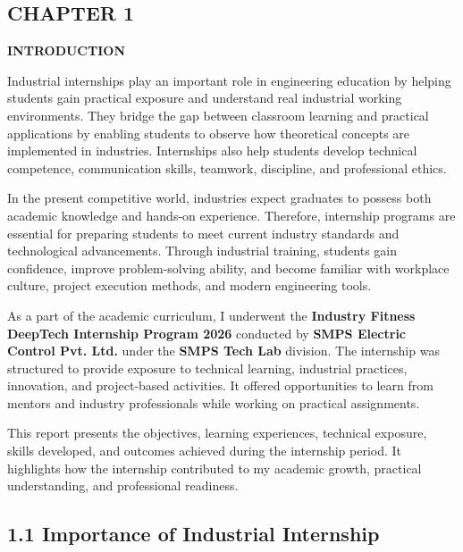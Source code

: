 \documentclass[10pt]{article}
\begin{document}
\doublespacing


\newpage
{}
\begin{flushleft}
{\fontsize{16pt}{16pt}\selectfont
\section*{CHAPTER 1}}
\end{flushleft}
\begin{center}
{\fontsize{18pt}{18pt}\selectfont \textbf{INTRODUCTION}}
\end{center}
\onehalfspacing
\fontsize{12pt}{14pt}\selectfont
\setlength{\parskip}{6pt}

\noindent
Industrial internships play an important role in engineering education by helping students gain practical    exposure and understand real industrial working environments. They bridge the gap between classroom learning and practical applications by enabling students to observe how theoretical concepts are implemented in industries. Internships also help students develop technical competence, communication skills, teamwork, discipline, and professional ethics.

\noindent
In the present competitive world, industries expect graduates to possess both academic knowledge and hands-on experience. Therefore, internship programs are essential for preparing students to meet current industry standards and technological advancements. Through industrial training, students gain confidence, improve problem-solving ability, and become familiar with workplace culture, project execution methods, and modern engineering tools.

\noindent
As a part of the academic curriculum, I underwent the \textbf{Industry Fitness DeepTech Internship Program 2026} conducted by \textbf{SMPS Electric Control Pvt. Ltd.} under the \textbf{SMPS Tech Lab} division. The internship was structured to provide exposure to technical learning, industrial practices, innovation, and project-based activities. It offered opportunities to learn from mentors and industry professionals while working on practical assignments.


\noindent
This report presents the objectives, learning experiences, technical exposure, skills developed, and outcomes achieved during the internship period. It highlights how the internship contributed to my academic growth, practical understanding, and professional readiness.
\setcounter{subsection}{0}
\subsection*{1.1 Importance of Industrial Internship}
\end{document}
